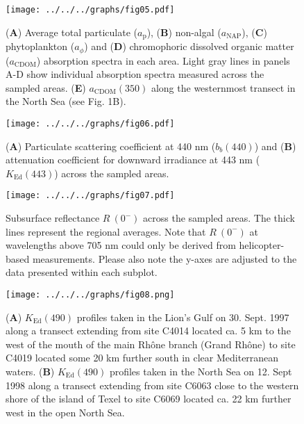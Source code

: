 \documentclass[essd, manuscript]{copernicus}
\begin{document}
\clearpage

\begin{figure}[t]
    \texttt{[image: ../../../graphs/fig05.pdf]}
    \caption{(\textbf{A}) Average total particulate ($a_\text{p}$), (\textbf{B}) non-algal ($a_\text{NAP}$), (\textbf{C}) phytoplankton ($a_{\phi}$) and (\textbf{D}) chromophoric dissolved organic matter ($a_\text{CDOM}$) absorption spectra in each area. Light gray lines in panels A-D show individual absorption spectra measured across the sampled areas. (\textbf{E}) $a_\text{CDOM}(350)$ along the westernmost transect in the North Sea (see Fig. 1B).}
\end{figure}

\clearpage

\begin{figure}[t]
    \texttt{[image: ../../../graphs/fig06.pdf]}
    \caption{(\textbf{A}) Particulate scattering coefficient at 440 nm ($b_{b}(440)$) and (\textbf{B}) attenuation coefficient for downward irradiance at 443 nm ($K_{\text{Ed}}(443)$) across the sampled areas.}
\end{figure}

\clearpage

\begin{figure}[t]
    \texttt{[image: ../../../graphs/fig07.pdf]}
    \caption{Subsurface reflectance $R~(0^{-})$ across the sampled areas. The thick lines represent the regional averages. Note that $R~(0^{-})$ at wavelengths above 705 nm could only be derived from helicopter-based measurements. Please also note the y-axes are adjusted to the data presented within each subplot.}
\end{figure}

\clearpage

\begin{figure}[t]
    \texttt{[image: ../../../graphs/fig08.png]}
    \caption{(\textbf{A}) $K_{\text{Ed}}(490)$ profiles taken in the Lion's Gulf on 30. Sept. 1997 along a transect extending from site C4014 located ca. 5 km to the west of the mouth of the main Rhône branch (Grand Rhône) to site C4019 located some 20 km further south in clear Mediterranean waters. (\textbf{B}) $K_{\text{Ed}}(490)$ profiles taken in the North Sea on 12. Sept 1998 along a transect extending from site C6063 close to the western shore of the island of Texel to site C6069 located ca. 22 km further west in the open North Sea.}
\end{figure}

\clearpage
\end{document}
